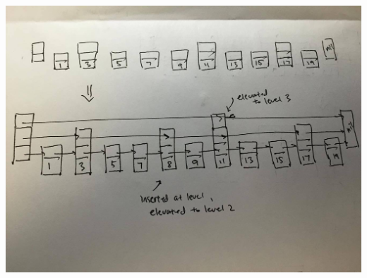 \documentclass{article}
\theoremstyle{casestyle}
\begin{document}
\begin{enumerate}[i]
\includegraphics[scale=.3]{4iv}

\end{enumerate}
\end{document}
